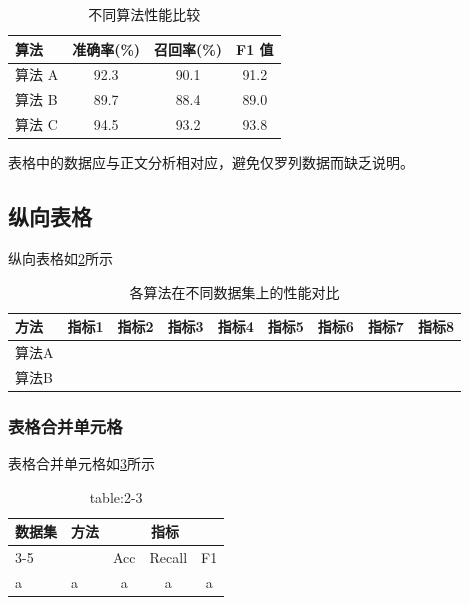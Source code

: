 \setlength{\tabcolsep}{20pt}
\begin{table}[htbp]
\centering
\caption{不同算法性能比较}
\label{tab:performance}
    \begin{tabular}{lccc}
    \toprule
        算法 & 准确率(\%) & 召回率(\%) & F1 值 \\ 
        \midrule
        算法 A & 92.3 & 90.1 & 91.2 \\
        算法 B & 89.7 & 88.4 & 89.0 \\
        算法 C & 94.5 & 93.2 & 93.8 \\
    \bottomrule
    \end{tabular}
\end{table}

表格中的数据应与正文分析相对应，避免仅罗列数据而缺乏说明。
\subsection{纵向表格}
纵向表格如\cref{tab:wide}所示
\begin{table}
\centering
\caption{各算法在不同数据集上的性能对比}
\label{tab:wide}
\begin{tabular}{lcccccccc}
\toprule
方法 & 指标1 & 指标2 & 指标3 & 指标4 & 指标5 & 指标6 & 指标7 & 指标8 \\
\midrule
算法A &  &  &  &  &  &  &  &  \\
算法B &  &  &  &  &  &  &  &  \\
\bottomrule
\end{tabular}
\end{table}

\subsubsection{表格合并单元格}
表格合并单元格如\cref{tab:2-3}所示
\begin{table}[ht]
    \centering
    \caption{table:2-3}
    \label{tab:2-3}
    \begin{tabular}{llccc}
    \toprule
    \multirow{2}{*}{数据集}
    & \multirow{2}{*}{方法}
    & \multicolumn{3}{c}{指标} \\
    \cmidrule(lr){3-5}
    & & Acc & Recall & F1 \\
    \midrule
    a & a & a & a & a\\  %
    \bottomrule
    \end{tabular}

\end{table}


